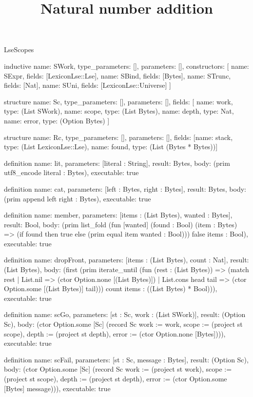 \begin{lexlean}{LseScopes}
\title{Natural number addition}
\begin{semanticmodule}
inductive{
  name: SWork,
  type_parameters: [],
  parameters: [],
  constructors: [
    {name: SExpr, fields: [LexiconLse::Lse]},
    {name: SBind, fields: [Bytes]},
    {name: STrunc, fields: [Nat]},
    {name: SUni, fields: [LexiconLse::Universe]}
  ]
}

structure{
  name: Sc,
  type_parameters: [],
  parameters: [],
  fields: [
    {name: work, type: (List SWork)},
    {name: scope, type: (List Bytes)},
    {name: depth, type: Nat},
    {name: error, type: (Option Bytes)}
  ]
}

structure{
  name: Rc,
  type_parameters: [],
  parameters: [],
  fields: [{name: stack, type: (List LexiconLse::Lse)}, {name: found, type: (List (Bytes * Bytes))}]
}

definition{
  name: lit,
  parameters: [literal : String],
  result: Bytes,
  body: (prim utf8_encode literal : Bytes),
  executable: true
}

definition{
  name: cat,
  parameters: [left : Bytes, right : Bytes],
  result: Bytes,
  body: (prim append left right : Bytes),
  executable: true
}

definition{
  name: member,
  parameters: [items : (List Bytes), wanted : Bytes],
  result: Bool,
  body: (prim list_fold (fun [wanted] (found : Bool) (item : Bytes) => (if found then true else (prim equal item wanted : Bool))) false items : Bool),
  executable: true
}

definition{
  name: dropFront,
  parameters: [items : (List Bytes), count : Nat],
  result: (List Bytes),
  body: (first (prim iterate_until (fun (rest : (List Bytes)) => (match rest
    | List.nil => (ctor Option.none [(List Bytes)])
    | List.cons head tail => (ctor Option.some [(List Bytes)] tail))) count items : ((List Bytes) * Bool))),
  executable: true
}

definition{
  name: scGo,
  parameters: [st : Sc, work : (List SWork)],
  result: (Option Sc),
  body: (ctor Option.some [Sc] (record Sc {work := work, scope := (project st scope), depth := (project st depth), error := (ctor Option.none [Bytes])})),
  executable: true
}

definition{
  name: scFail,
  parameters: [st : Sc, message : Bytes],
  result: (Option Sc),
  body: (ctor Option.some [Sc] (record Sc {work := (project st work), scope := (project st scope), depth := (project st depth), error := (ctor Option.some [Bytes] message)})),
  executable: true
}


\end{semanticmodule}
\end{lexlean}
